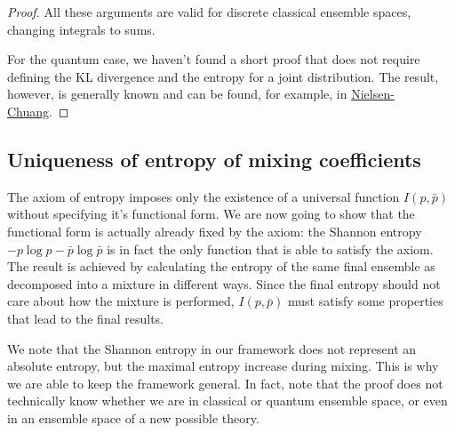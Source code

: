 \begin{mathSection}
\begin{proof}
		All these arguments are valid for discrete classical ensemble spaces, changing integrals to sums.
		
		For the quantum case, we haven't found a short proof that does not require defining the KL divergence and the entropy for a joint distribution. The result, however, is generally known and can be found, for example, in \href{https://www.cambridge.org/highereducation/books/quantum-computation-and-quantum-information/01E10196D0A682A6AEFFEA52D53BE9AE}{Nielsen-Chuang}.
	\end{proof}
\end{mathSection}


\subsection{Uniqueness of entropy of mixing coefficients}

The axiom of entropy imposes only the existence of a universal function $I(p,\bar{p})$ without specifying it's functional form. We are now going to show that the functional form is actually already fixed by the axiom: the Shannon entropy $-p \log p - \bar{p} \log \bar{p}$ is in fact the only function that is able to satisfy the axiom. The result is achieved by calculating the entropy of the same final ensemble as decomposed into a mixture in different ways. Since the final entropy should not care about how the mixture is performed, $I(p,\bar{p})$ must satisfy some properties that lead to the final results.

We note that the Shannon entropy in our framework does not represent an absolute entropy, but the maximal entropy increase during mixing. This is why we are able to keep the framework general. In fact, note that the proof does not technically know whether we are in classical or quantum ensemble space, or even in an ensemble space of a new possible theory.

